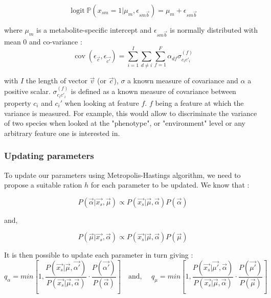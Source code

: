 \documentclass[a4paper,10pt]{article}
\DeclareMathOperator{\logit}{logit}
\DeclareMathOperator{\cov}{cov}
\def\P{\mathbb{P}}
\begin{document}
	\begin{equation}
	\logit \P(x_{sm}=1|\mu_m, \epsilon_{sm\vec{b}}) = \mu_m + \epsilon_{sm\vec{b}}
	\end{equation}
	
	where $\mu_m$ is a metabolite-specific intercept and $\epsilon_{sm\vec{b}}$ is normally distributed with mean 0 and co-variance : 
	\begin{equation}
		\cov(\epsilon_{\vec{c}},\epsilon_{\vec{c'}})= \sum_{i=1}^{I} \sum_{d\ne i} \sum_{f=1}^{F} \alpha_{df} \sigma_{c_ic'_i}^{(f)}
	\end{equation} 
	
	with $I$ the length of vector $\vec{v}$ (or $\vec{c}$), $\sigma$ a known measure of covariance and $\alpha$ a positive scalar. $\sigma_{c_ic'_i}^{(f)}$ is defined as a known measure of covariance between property $c_i$ and $c_i'$ when looking at feature $f$. $f$ being a feature at which the variance is measured. For example, this would allow to discriminate the variance of two species when looked at the "phenotype", or "environment" level or any arbitrary feature one is interested in.  

	
	\subsubsection{Updating parameters}
	
	To update our parameters using Metropolis-Hastings algorithm, we need to propose a suitable ration $h$ for each parameter to be updated. We know that :
	
	\begin{equation}
		P(\vec{\alpha} | \vec{x_s}, \vec{\mu}) \propto P(\vec{x_s} | \vec{\mu}, \vec{\alpha}) P(\vec{\alpha})
	\end{equation}

	and, 
	
	\begin{equation}
		P(\vec{\mu} | \vec{x_s}, \vec{\alpha}) \propto P(\vec{x_s} | \vec{\mu}, \vec{\alpha}) P(\vec{\mu})
	\end{equation}

	It is then possible to update each parameter in turn giving :
	\begin{equation}
		q_{\alpha} = min\left[1, \dfrac{P(\vec{x_s} | \vec{\mu}, \vec{\alpha\prime})}{P(\vec{x_s} | \vec{\mu}, \vec{\alpha})} \cdot \dfrac{P(\vec{\alpha\prime})}{P(\vec{\alpha})}\right] 
		\quad \text{and, } \quad 
		q_{\mu} = min\left[1, \dfrac{P(\vec{x_s} | \vec{\mu\prime}, \vec{\alpha})}{P(\vec{x_s} | \vec{\mu}, \vec{\alpha})} \cdot \dfrac{P(\vec{\mu\prime})}{P(\vec{\mu})} \right]
	\end{equation}
	
\end{document}
